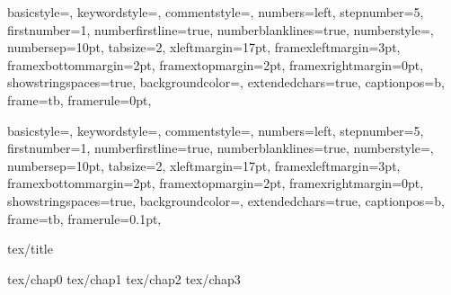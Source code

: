 \documentclass[a4paper,onecolumn,oneside,12pt,wide,floatssmall]{mwrep}
\theoremstyle{definition}
\theoremstyle{plain}%
\theoremstyle{remark}
\begin{document}
{
basicstyle={\footnotesize},
keywordstyle={\bf\footnotesize\color{blue}},
commentstyle={\em\footnotesize\color{magenta}},
numbers=left,
stepnumber=5,
firstnumber=1,
numberfirstline=true,
numberblanklines=true,
numberstyle={\sf\tiny},
numbersep=10pt,
tabsize=2,
xleftmargin=17pt,
framexleftmargin=3pt,
framexbottommargin=2pt,
framextopmargin=2pt,
framexrightmargin=0pt,
showstringspaces=true,
backgroundcolor={\color{ListingBackground}},
extendedchars=true,
captionpos=b,
frame=tb,
framerule=0pt,
}

{
basicstyle={\footnotesize},
keywordstyle={\bf\footnotesize\color{blue}},
commentstyle={\em\footnotesize\color{magenta}},
numbers=left,
stepnumber=5,
firstnumber=1,
numberfirstline=true,
numberblanklines=true,
numberstyle={\sf\tiny},
numbersep=10pt,
tabsize=2,
xleftmargin=17pt,
framexleftmargin=3pt,
framexbottommargin=2pt,
framextopmargin=2pt,
framexrightmargin=0pt,
showstringspaces=true,
backgroundcolor={\color{ListingBackground}},
extendedchars=true,
captionpos=b,
frame=tb,
framerule=0.1pt,
}

\renewcommand*\lstlistingname{Wydruk}
\renewcommand*\lstlistlistingname{Spis wydruków}

\renewcommand{\baselinestretch}{1.0}
\raggedbottom
 {tex/title}

\tableofcontents


\newpage
{}
\setcounter{page}{1}

 {tex/chap0}
 {tex/chap1}
 {tex/chap2}
 {tex/chap3}

\appendix


\nocite{*}


% 

\end{document}
